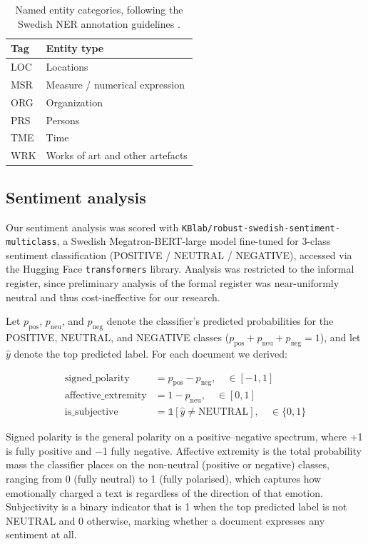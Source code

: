 \documentclass[thesis]{cluu}
\begin{document}
\begin{table}[h]
\centering
\begin{tabular}{ll}
\toprule
\textbf{Tag} & \textbf{Entity type} \\
\midrule
LOC & Locations \\
MSR & Measure / numerical expression \\
ORG & Organization \\
PRS & Persons \\
TME & Time \\
WRK & Works of art and other artefacts \\
\bottomrule
\end{tabular}
\caption{Named entity categories, following the Swedish NER annotation
guidelines \parencite{sprakbanken2020ner}.}
\label{tab:ner-categories}
\end{table}

\subsection{Sentiment analysis}
Our sentiment analysis was scored with \texttt{KBlab/robust-swedish-sentiment-multiclass}, a Swedish Megatron-BERT-large model fine-tuned for 3-class sentiment classification (POSITIVE / NEUTRAL / NEGATIVE), accessed via the Hugging Face \texttt{transformers} library. Analysis was restricted to the informal register, since preliminary analysis of the formal register was near-uniformly neutral and thus cost-ineffective for our research.

Let $p_{\text{pos}}$, $p_{\text{neu}}$, and $p_{\text{neg}}$ denote the classifier's
predicted probabilities for the POSITIVE, NEUTRAL, and NEGATIVE classes
($p_{\text{pos}} + p_{\text{neu}} + p_{\text{neg}} = 1$), and let $\hat{y}$ denote the
top predicted label. For each document we derived:

\begin{align}
  \text{signed\_polarity} &= p_{\text{pos}} - p_{\text{neg}}, \quad \in [-1, 1] \label{eq:signed-polarity}\\[4pt]
  \text{affective\_extremity} &= 1 - p_{\text{neu}}, \quad \in [0, 1] \label{eq:affective-extremity}\\[4pt]
  \text{is\_subjective} &= \mathbb{1}[\hat{y} \neq \text{NEUTRAL}], \quad \in \{0, 1\} \label{eq:is-subjective}
\end{align}

Signed polarity is the general polarity on a positive–negative spectrum, where +1 is fully positive and −1 fully negative. Affective extremity is the total probability mass the classifier places on the non-neutral (positive or negative) classes, ranging from 0 (fully neutral) to 1 (fully polarised), which captures how emotionally charged a text is regardless of the direction of that emotion. Subjectivity is a binary indicator that is 1 when the top predicted label is not NEUTRAL and 0 otherwise, marking whether a document expresses any sentiment at all.
\end{document}
